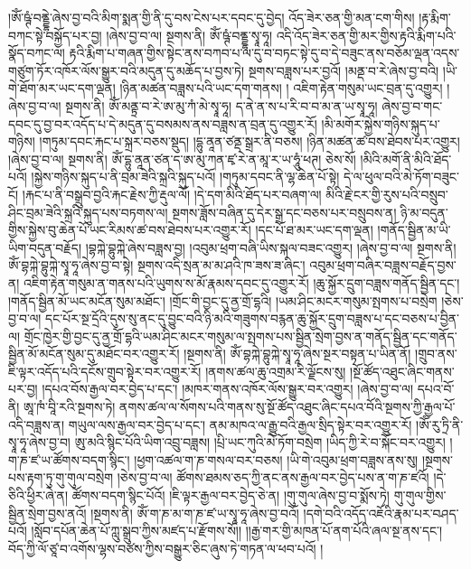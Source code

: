 །ཨོཾ་ཥྚཾ་བནྡྷེ་ཞེས་བྱ་བའི་མིག་སྨན་གྱི་ནི་དུ་བས་ངེས་པར་དབང་དུ་བྱེད། འོད་ཟེར་ཅན་གྱི་མན་ངག་གིས། །རྟ་རྨིག་བཀང་སྟེ་བསྐྱོད་པར་བྱ། །ཞེས་བྱ་བ་ལ། སྔགས་ནི། ཨོཾ་ཥྚཾ་བནྡྷ་སྭཱ་ཧཱ། འདི་འོད་ཟེར་ཅན་གྱི་མར་གྱིས་རྟའི་རྨིག་པའི་སྣོད་བཀང་ལ། རྟའི་རྨིག་པ་གཞན་གྱིས་སྟེང་ནས་བཀབ་པ་ལ་དུ་བ་བཏང་སྟེ་དུ་བ་དེ་བཟུང་ནས་བཅོམ་ལྡན་འདས་གཙུག་ཏོར་འཁོར་ལོས་སྒྱུར་བའི་མདུན་དུ་མཆོད་པ་བྱས་ཏེ། སྔགས་བཟླས་པར་བྱའོ། །མནྡ་བ་རེ་ཞེས་བྱ་བའི། །ཡི་གེ་ཐོག་མར་ཡང་དག་ལྡན། །ཉིན་མཚན་བཟླས་པའི་ཡང་དག་གནས། །
འཇིག་རྟེན་གསུམ་ཡང་བྲན་དུ་འགྱུར། །ཞེས་བྱ་བ་ལ། སྔགས་ནི། ཨོཾ་མནྟྲ་བ་རེ་ཨ་མུ་ཀཾ་མེ་སྭཱ་ཧཱ། ད་ནེ་ན་ས་པ་རི་བ་བ་མ་ན་ཡ་སྭཱ་ཧཱ། ཞེས་བྱ་བ་གང་དབང་དུ་བྱ་བར་འདོད་པ་དེ་མདུན་དུ་བསམས་ནས་བཟླས་ན་བྲན་དུ་འགྱུར་རོ། །མི་མགོར་སྐྱེས་གཉིས་སྐུད་པ་གཉིས། །གཏུམ་དབང་རྐང་པ་སྐྲར་བཅས་སྡུད། །དྷུ་ནཱན་ཙནྡ་སྒྲར་ནི་བཅས། །ཉིན་མཚན་ཚ་བས་ཐེབས་པར་འགྱུར། །ཞེས་བྱ་བ་ལ། སྔགས་ནི། ཨོཾ་དྷུ་ནཱན་ཙན་ད་ཨ་མུ་ཀན་ཛྭ་རེ་ན་མཱ་ར་ཡ་ཧཱུཾ་ཕཊ། ཅེས་སོ། །མིའི་མགོ་ནི་མིའི་ཐོད་པའོ། །སྐྱེས་གཉིས་སྐུད་པ་ནི་བྲམ་ཟེའི་སྐྲའི་སྐུད་པའོ། །གཏུམ་དབང་ནི་ལྷ་ཆེན་པོ་སྟེ། དེ་ལ་ཕུལ་བའི་མེ་ཏོག་བཟུང་ངོ། །རྐང་པ་ནི་བསྒྲུབ་བྱའི་རྐང་རྗེས་ཀྱི་རྡུལ་ལོ། །དེ་དག་མིའི་ཐོད་པར་བཞག་ལ། མིའི་རྗེ་ངར་གྱི་རུས་པའི་བསྲུབ་ཤིང་བྲམ་ཟེའི་སྐྲའི་སྐུད་པས་བཏགས་ལ། སྔགས་ཟློས་བཞིན་དུ་དེར་སྒྲ་དང་བཅས་པར་བསྲུབས་ན། ཉི་མ་བདུན་གྱིས་སྐྱེས་བུ་ཆེན་པོ་ཡང་རིམས་ཚ་བས་ཐེབས་པར་འགྱུར་རོ། །དང་པོ་ཐ་མར་ཡང་དག་ལྡན། །གནོད་སྦྱིན་མ་ཡི་ཡིག་བདུན་བརྗོད། །བྷཀྐེ་བྷུཀྐེ་ཞེས་བཟླས་བྱ། །འབུམ་ཕྲག་བཞི་ཡིས་སྐལ་བཟང་འགྱུར། །ཞེས་བྱ་བ་ལ། སྔགས་ནི། ཨོཾ་བྷཀྐེ་བྷུཀྐེ་སྭཱ་ཧཱ་ཞེས་བྱ་བ་སྟེ། སྔགས་འདི་སྲན་མ་མ་ཤའི་ཁ་ཟས་ཟ་ཞིང་། འབུམ་ཕྲག་བཞིར་བཟླས་བརྗོད་བྱས་ན། འཇིག་རྟེན་གསུམ་ན་གནས་པའི་ཡུགས་ས་མོ་རྣམས་དབང་དུ་འགྱུར་རོ། །ཆུ་སྐྱོར་དྲུག་བཟླས་གནོད་སྦྱིན་དང་། །གནོད་སྦྱིན་མོ་ཡང་མངོན་སུམ་མཐོང་། །གྲོང་གི་བྱང་དུ་ནྱ་གྲོ་དྷའི། །ཡམ་ཤིང་མངར་གསུམ་སྤགས་པ་བསྲེག །ཅེས་བྱ་བ་ལ། དང་པོར་སྔ་དྲོའི་དུས་སུ་ནང་དུ་བྱུང་བའི་ཉི་མའི་གཟུགས་བརྙན་ཆུ་སྐྱོར་དྲུག་བཟླས་པ་དང་བཅས་པ་བྱིན་ལ། གྲོང་ཁྱེར་གྱི་བྱང་དུ་ནྱ་གྲོ་དྷའི་ཡམ་ཤིང་མངར་གསུམ་ལ་སྤགས་པས་སྦྱིན་སྲེག་བྱས་ན་གནོད་སྦྱིན་དང་གནོད་སྦྱིན་མོ་མངོན་སུམ་དུ་མཐོང་བར་འགྱུར་རོ། །སྔགས་ནི། ཨོཾ་བྷཀྐེ་བྷུཀྐེ་སྭཱ་ཧཱ་ཞེས་སྔར་བསྟན་པ་ཡིན་ནོ། །གྲུབ་ནས་ཇི་ལྟར་འདོད་པའི་དངོས་གྲུབ་སྟེར་བར་འགྱུར་རོ། །ནགས་ཚལ་ཆུ་འགྲམ་རི་ལྗོངས་སུ། །སྔོ་ཚོད་འཐུང་ཞིང་གནས་པར་བྱ། །དཔའ་བོས་རྒྱལ་བར་བྱེད་པ་དང་། །མཁར་གནས་འཁོར་ལོས་སྒྱུར་བར་འགྱུར། །ཞེས་བྱ་བ་ལ། དཔའ་བོ་ནི། ཨཱ་ཁཾ་བཱི་རའི་སྔགས་ཏེ། ནགས་ཚལ་ལ་སོགས་པའི་གནས་སུ་སྔོ་ཚོད་འཐུང་ཞིང་དཔའ་བོའི་སྔགས་ཀྱི་རྒྱལ་པོ་འདི་བཟླས་ན། གཡུལ་ལས་རྒྱལ་བར་བྱེད་པ་དང་། ནམ་མཁའ་ལ་རྒྱུ་བའི་རྒྱལ་སྲིད་སྟེར་བར་འགྱུར་རོ། །ཨོཾ་རུ་ཏྲི་ནི་སྭཱ་ཧཱ་ཞེས་བྱ་བ། ཨུ་མའི་སྙིང་པོའི་ཡིག་འབྲུ་བཟླས། །པྲི་ཡང་ཀུའི་མེ་ཏོག་བསྲེག །ཡིད་ཀྱི་རེ་བ་སྐོང་བར་འགྱུར། །ག་ཎ་ཛ་ཡ་ཚོགས་བདག་སྙིང་། །ཕྱག་འཚལ་ག་ཎ་གསལ་བར་བཅས། །ཡི་གེ་འབུམ་ཕྲག་བཟླས་ནས་སུ། །སྔགས་པས་རྟག་ཏུ་གུ་གུལ་བསྲེག །ཅེས་བྱ་བ་ལ། ཚོགས་ཐམས་ཅད་ཀྱི་ནང་ནས་རྒྱལ་བར་བྱེད་པས་ན་ག་ཎ་ཛའོ། །དེ་ཅིའི་ཕྱིར་ཞེ་ན། ཚོགས་བདག་སྙིང་པོའོ། །ཇི་ལྟར་རྒྱལ་བར་བྱེད་ཅེ་ན། །གུ་གུལ་ཞེས་བྱ་བ་སྨོས་ཏེ། གུ་གུལ་གྱིས་སྦྱིན་སྲེག་བྱས་ནའོ། །སྔགས་ནི། ཨོཾ་ག་ཎ་མ་ག་ཎ་ཛ་ཡ་སྭཱ་ཧཱ་ཞེས་བྱ་བའོ། །དགེ་བའི་འདོད་འཇོའི་རྣམ་པར་བཤད་པའོ། །སློབ་དཔོན་ཆེན་པོ་ཀླུ་སྒྲུབ་ཀྱིས་མཛད་པ་རྫོགས་སོ།། །།རྒྱ་གར་གྱི་མཁན་པོ་ནག་པོའི་ཞལ་སྔ་ནས་དང་། བོད་ཀྱི་ལོ་ཙཱ་བ་འགོས་ལྷས་བཙས་ཀྱིས་བསྒྱུར་ཅིང་ཞུས་ཏེ་གཏན་ལ་ཕབ་པའོ། །